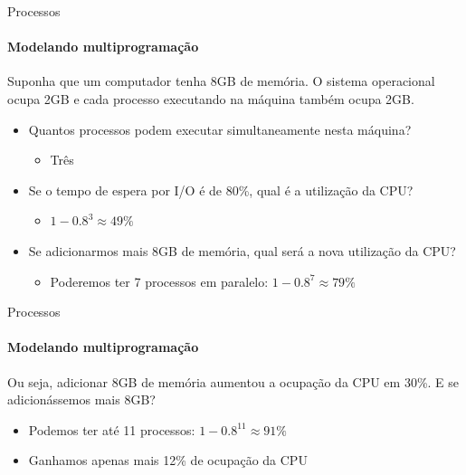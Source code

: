 \documentclass{beamer}
\begin{document}
 \begin{frame}{Processos}
  	\framesubtitle{Modelando multiprogramação}
  	Suponha que um computador tenha 8GB de memória. O sistema operacional ocupa 2GB e cada processo executando na máquina também ocupa 2GB.
  	\begin{itemize}
  		\item Quantos processos podem executar simultaneamente nesta máquina? \pause
  		\begin{itemize}
  			\item Três
  		\end{itemize}
  		\item Se o tempo de espera por I/O é de 80\%, qual é a utilização da CPU? \pause
  		\begin{itemize}
  			\item $1 - 0.8^{3} \approx 49\%$
  		\end{itemize}
  		\item Se adicionarmos mais 8GB de memória, qual será a nova utilização da CPU?
  		\begin{itemize}
  			\item Poderemos ter 7 processos em paralelo: $1-0.8^{7} \approx 79\%$
  		\end{itemize}
  	\end{itemize}
  \end{frame}
  \begin{frame}{Processos}
   	\framesubtitle{Modelando multiprogramação}
   	Ou seja, adicionar 8GB de memória aumentou a ocupação da CPU em 30\%. E se adicionássemos mais 8GB? \pause
   	\begin{itemize}
   		\item Podemos ter até 11 processos: $1 - 0.8^{11} \approx 91\%$
   		\item Ganhamos apenas mais 12\% de ocupação da CPU
   	\end{itemize}
\end{frame}
\end{document}
